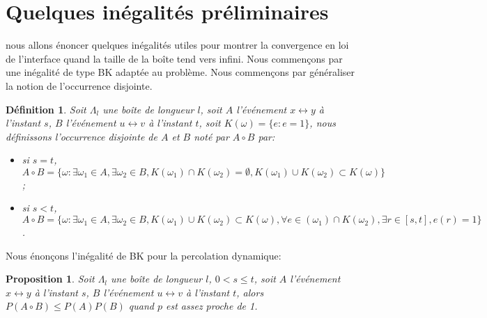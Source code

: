 \documentclass[titlepage,a4paper,12pt]{article}
\newcounter{def}
\newcounter{prop}
\newtheorem{occ}[def]{Définition}
\newtheorem{bk}[prop]{Proposition}
\newcommand{\connect}{\leftrightarrow}
\begin{document}
\section{Quelques inégalités préliminaires}
nous allons énoncer quelques inégalités utiles pour montrer la convergence en loi de l'interface quand la taille de la boîte tend vers infini. Nous commençons par une inégalité de type BK adaptée au problème. Nous commençons par généraliser la notion de l'occurrence disjointe.

\begin{occ}
Soit $\Lambda_l$ une boîte de longueur $l$, soit $A$ l'événement $x\connect y$ à l'instant $s$, $B$ l'événement $u\connect v$ à l'instant $t$, soit $K(\omega) = \{e: e=1\}$, nous définissons l'occurrence disjointe de $A$ et $B$ noté par $A\circ B$ par:
\begin{itemize}
\item si $s=t$, $A\circ B = \{\omega: \exists\omega_1\in A,\exists\omega_2\in B, K(\omega_1)\cap K(\omega_2) = \emptyset, K(\omega_1)\cup K(\omega_2)\subset K(\omega) \}$;
\item si $s<t$, $A\circ B = \{\omega: \exists\omega_1\in A,\exists\omega_2\in B, K(\omega_1)\cup K(\omega_2)\subset K(\omega), \forall e\in (\omega_1)\cap K(\omega_2), \exists r\in [s,t], e(r) = 1 \}$.
\end{itemize}
\end{occ}
Nous énonçons l'inégalité de BK pour la percolation dynamique:

\begin{bk}
Soit $\Lambda_l$ une boîte de longueur $l$, $0<s\leqslant t$, soit $A$ l'événement $x\connect y$ à l'instant $s$, $B$ l'événement $u\connect v$ à l'instant $t$, alors $P(A\circ B) \leqslant P(A)P(B)$ quand $p$ est assez proche de 1.
\end{bk}
\end{document}

